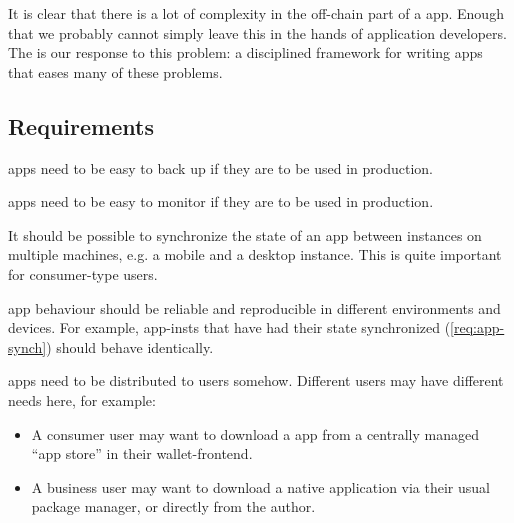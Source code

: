 It is clear that there is a lot of complexity in the \gls{off-chain} part of a \gls{app}.
Enough that we probably cannot simply leave this in the hands of application developers.
The  is our response to this problem: a disciplined framework for writing \glspl{app} that eases many of these problems.

\subsection{Requirements}
\begin{requirement}[Backups]
\label{req:app-backups}
\Glspl{app} need to be easy to back up if they are to be used in production.
\end{requirement}

\begin{requirement}[Monitoring]
\label{req:app-monitoring}
\Glspl{app} need to be easy to monitor if they are to be used in production.
\end{requirement}

\begin{requirement}[Synchronization]
\label{req:app-synch}
It should be possible to synchronize the state of an \gls{app} between instances on multiple machines, e.g. a mobile and a desktop instance.
This is quite important for consumer-type users.
\end{requirement}

\begin{requirement}[Reproducibility]
\label{req:app-reproducibility}
\Gls{app} behaviour should be reliable and reproducible in different environments and devices.
For example, \glspl{app-inst} that have had their state synchronized (\cref{req:app-synch}) should behave identically.
\end{requirement}

\begin{requirement}[Distribution]
\label{req:app-dist}
\Glspl{app} need to be distributed to users somehow.
Different users may have different needs here, for example:
\begin{itemize}
\item A consumer user may want to download a \gls{app} from a centrally managed ``app store'' in their \gls{wallet-frontend}.
\item A business user may want to download a native application via their usual package manager, or directly from the author.
\end{itemize}
\end{requirement}

